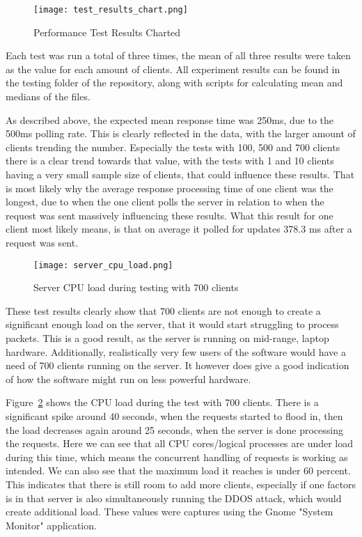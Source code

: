\begin{figure}[h]
\caption{Performance Test Results Charted}
\texttt{[image: test\_results\_chart.png]}
\label{fig:test_results_chart}
\end{figure}

Each test was run a total of three times, the mean of all three results were taken as the value for each amount of clients. All experiment results can be found in the testing folder of the repository, along with scripts for calculating mean and medians of the files.

As described above, the expected mean response time was 250ms, due to the 500ms polling rate. This is clearly reflected in the data, with the larger amount of clients trending the number. Especially the tests with 100, 500 and 700 clients there is a clear trend towards that value, with the tests with 1 and 10 clients having a very small sample size of clients, that could influence these results. That is most likely why the average response processing time of one client was the longest, due to when the one client polls the server in relation to when the request was sent massively influencing these results. What this result for one client most likely means, is that on average it polled for updates 378.3 ms after a request was sent.

\begin{figure}[h]
\caption{Server CPU load during testing with 700 clients}
\texttt{[image: server\_cpu\_load.png]}
\label{fig:server_cpu_load}
\end{figure}

These test results clearly show that 700 clients are not enough to create a significant enough load on the server, that it would start struggling to process packets. This is a good result, as the server is running on mid-range, laptop hardware. Additionally, realistically very few users of the software would have a need of 700 clients running on the server. It however does give a good indication of how the software might run on less powerful hardware.

Figure~\ref{fig:server_cpu_load} shows the CPU load during the test with 700 clients. There is a significant spike around 40 seconds, when the requests started to flood in, then the load decreases again around 25 seconds, when the server is done processing the requests. Here we can see that all CPU cores/logical processes are under load during this time, which means the concurrent handling of requests is working as intended. We can also see that the maximum load it reaches is under 60 percent. This indicates that there is still room to add more clients, especially if one factors is in that server is also simultaneously running the DDOS attack, which would create additional load. These values were captures using the Gnome "System Monitor" application.

